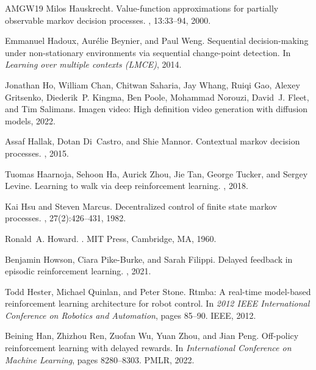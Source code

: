 \begin{thebibliography}{AMGW{\etalchar{+}}19}
Milos Hauskrecht.
\newblock Value-function approximations for partially observable markov decision processes.
, 13:33--94, 2000.

Emmanuel Hadoux, Aur{\'e}lie Beynier, and Paul Weng.
\newblock Sequential decision-making under non-stationary environments via sequential change-point detection.
\newblock In {\em Learning over multiple contexts (LMCE)}, 2014.

Jonathan Ho, William Chan, Chitwan Saharia, Jay Whang, Ruiqi Gao, Alexey Gritsenko, Diederik~P. Kingma, Ben Poole, Mohammad Norouzi, David~J. Fleet, and Tim Salimans.
\newblock Imagen video: High definition video generation with diffusion models, 2022.

Assaf Hallak, Dotan Di~Castro, and Shie Mannor.
\newblock Contextual markov decision processes.
, 2015.

Tuomas Haarnoja, Sehoon Ha, Aurick Zhou, Jie Tan, George Tucker, and Sergey Levine.
\newblock Learning to walk via deep reinforcement learning.
, 2018.

Kai Hsu and Steven Marcus.
\newblock Decentralized control of finite state markov processes.
, 27(2):426--431, 1982.

Ronald~A. Howard.
.
\newblock MIT Press, Cambridge, MA, 1960.

Benjamin Howson, Ciara Pike-Burke, and Sarah Filippi.
\newblock Delayed feedback in episodic reinforcement learning.
, 2021.

Todd Hester, Michael Quinlan, and Peter Stone.
\newblock Rtmba: A real-time model-based reinforcement learning architecture for robot control.
\newblock In {\em 2012 IEEE International Conference on Robotics and Automation}, pages 85--90. IEEE, 2012.

Beining Han, Zhizhou Ren, Zuofan Wu, Yuan Zhou, and Jian Peng.
\newblock Off-policy reinforcement learning with delayed rewards.
\newblock In {\em International Conference on Machine Learning}, pages 8280--8303. PMLR, 2022.


\end{thebibliography}
